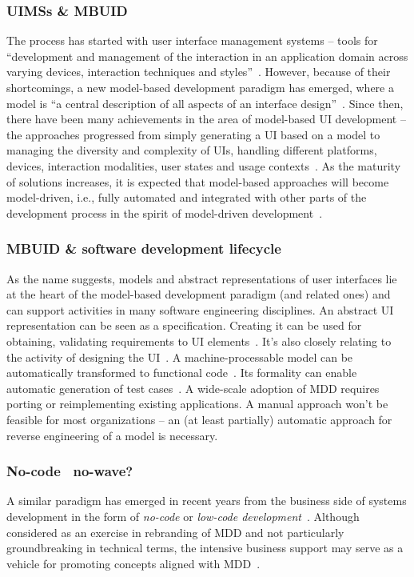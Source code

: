 \subsubsection{UIMSs \& MBUID}
The process has started with user interface management systems – tools for \enquote{development and management of the interaction in an application domain across varying devices, interaction techniques and styles}~\cite{Betts1987}.
However, because of their shortcomings, a new model-based development paradigm has emerged, where a model is \enquote{a central description of all aspects of an interface design}~\cite{Puerta1994}.
Since then, there have been many achievements in the area of model-based UI development – the approaches progressed from simply generating a UI based on a model to managing the diversity and complexity of UIs, handling different platforms, devices, interaction modalities, user states and usage contexts~\cite{Meixner2011}.
As the maturity of solutions increases, it is expected that model-based approaches will become model-driven, i.e., fully automated and integrated with other parts of the development process in the spirit of model-driven development~\cite{Ruiz2018}.

\subsubsection{MBUID \& software development lifecycle}
As the name suggests, models and abstract representations of user interfaces lie at the heart of the model-based development paradigm (and related ones) and can support activities in many software engineering disciplines.
An abstract UI representation can be seen as a specification.
Creating it can be used for obtaining, validating requirements to UI elements~\cite{Homrighausen2002}.
It’s also closely relating to the activity of designing the UI~\cite{Feuerstack2006}.
A machine-processable model can be automatically transformed to functional code~\cite{Fu2011, MonteMor2011}.
Its formality can enable automatic generation of test cases~\cite{Vieira2006}.
A wide-scale adoption of MDD requires porting or reimplementing existing applications.
A manual approach won’t be feasible for most organizations – an (at least partially) automatic approach for reverse engineering of a model is necessary.

\subsubsection{No-code \textendash\ no-wave?}
A similar paradigm has emerged in recent years from the business side of systems development in the form of \emph{no-code} or \emph{low-code development}~\cite{Rymer2019}.
Although considered as an exercise in rebranding of MDD and not particularly groundbreaking in technical terms, the intensive business support may serve as a vehicle for promoting concepts aligned with MDD~\cite{Bock2021}.

